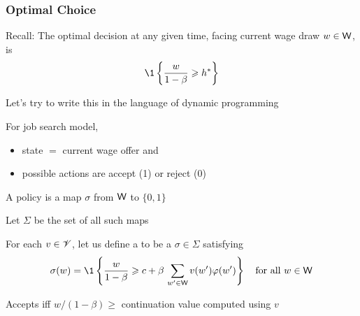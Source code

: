 \begin{frame}
    \frametitle{Optimal Choice}
    
    Recall: The optimal decision at any given time, facing current wage draw $w \in
    \mathsf W$, is 
    \begin{equation*}
        \1 \left\{ \frac{w}{1-\beta} \geq h^* \right\}
    \end{equation*}

    \vspace{1em}

    Let's try to write this in the language of dynamic programming
    

\end{frame}



\begin{frame}
    
    For job search model, 
    \begin{itemize}
        \item state $=$ current wage offer and 
        \item possible actions are accept (1) or reject (0)
    \end{itemize}

    A policy is a map $\sigma$ from $\mathsf W$ to $\{0,1\}$

    Let $\Sigma$ be the set of all such maps

    For each $v \in \mathscr V$, let us define a  to be a $\sigma \in \Sigma$ satisfying
    \begin{equation*}
        \sigma(w) 
        = \1
        \left\{
            \frac{w}{1-\beta}
            \geq
            c + \beta \, \sum_{w' \in \Wsf} v(w') \phi(w')
        \right\}
        \quad \text{for all } w \in \Wsf
    \end{equation*}

    Accepts iff $w/(1-\beta) \geq$ continuation value computed
    using $v$ 

\end{frame}


